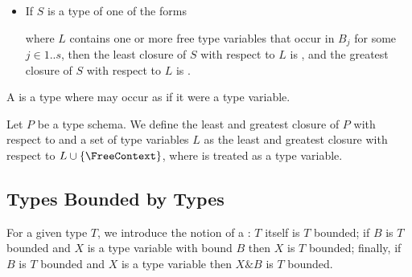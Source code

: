 \documentclass[makeidx]{article}
\begin{document}
{\begin{itemize}
\begin{itemize}
    \noindent

    \noindent
    where $U_0$ is the greatest closure of $T_0$ with respect to $L$,
    $U_j$ is the least closure of $T_j$ with respect to $L$
    for each $j \in 1 .. n + k$.
    It is assumed that type variables have been consistently renamed
    if necessary,
    such that no $X_j$ appears in $L$,
    for each $j \in 1 .. s$.
  \end{itemize}
\item
  If $S$ is a type of one of the forms

  \noindent

  \noindent

  \noindent
  where $L$ contains one or more free type variables that occur in $B_j$
  for some $j \in 1 .. s$,
  then the least closure of $S$ with respect to $L$ is ,
  and the greatest closure of $S$ with respect to $L$ is \FUNCTION.
\end{itemize}

\LMHash{}%
A  is a type where
\FreeContext{} may occur as if it were a type variable.


\LMHash{}%
Let $P$ be a type schema.
We define the least and greatest closure of $P$
with respect to \FreeContext{} and a set of type variables $L$ as
the least and greatest closure with respect to $L \cup \{\FreeContext\}$,
where \FreeContext{} is treated as a type variable.



\subsection{Types Bounded by Types}

\LMHash{}%
For a given type $T$, we introduce the notion of a
:
$T$ itself is $T$ bounded;
if $B$ is $T$ bounded and
$X$ is a type variable with bound $B$
then $X$ is $T$ bounded;
finally, if $B$ is $T$ bounded and
$X$ is a type variable
then $X \& B$ is $T$ bounded.

}
\end{document}
